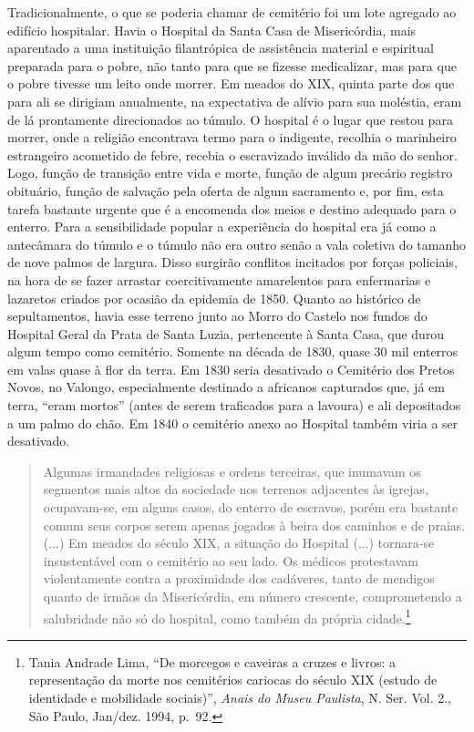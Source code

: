 Tradicionalmente, o que se poderia chamar de cemitério foi um lote
agregado ao edifício hospitalar. Havia o Hospital da Santa Casa de
Misericórdia, mais aparentado a uma instituição filantrópica de
assistência material e espiritual preparada para o pobre, não tanto para
que se fizesse medicalizar, mas para que o pobre tivesse um leito onde
morrer. Em meados do XIX, quinta parte dos que para ali se dirigiam
anualmente, na expectativa de alívio para sua moléstia, eram de lá
prontamente direcionados ao túmulo. O hospital é o lugar que restou para
morrer, onde a religião encontrava termo para o indigente, recolhia o
marinheiro estrangeiro acometido de febre, recebia o escravizado
inválido da mão do senhor. Logo, função de transição entre vida e morte,
função de algum precário registro obituário, função de salvação pela
oferta de algum sacramento e, por fim, esta tarefa bastante urgente que
é a encomenda dos meios e destino adequado para o enterro. Para a
sensibilidade popular a experiência do hospital era já como a antecâmara
do túmulo e o túmulo não era outro senão a vala coletiva do tamanho de
nove palmos de largura. Disso surgirão conflitos incitados por forças
policiais, na hora de se fazer arrastar coercitivamente amarelentos para
enfermarias e lazaretos criados por ocasião da epidemia de 1850. Quanto
ao histórico de sepultamentos, havia esse terreno junto ao Morro do
Castelo nos fundos do Hospital Geral da Prata de Santa Luzia,
pertencente à Santa Casa, que durou algum tempo como cemitério. Somente
na década de 1830, quase 30 mil enterros em valas quase à flor da terra.
Em 1830 seria desativado o Cemitério dos Pretos Novos, no Valongo,
especialmente destinado a africanos capturados que, já em terra, ``eram
mortos'' (antes de serem traficados para a lavoura) e ali depositados a
um palmo do chão. Em 1840 o cemitério anexo ao Hospital também viria a
ser desativado.

\begin{quote}
Algumas irmandades religiosas e ordens terceiras, que inumavam os
segmentos mais altos da sociedade nos terrenos adjacentes às igrejas,
ocupavam-se, em alguns casos, do enterro de escravos, porém era bastante
comum seus corpos serem apenas jogados à beira dos caminhos e de praias.
(...) Em meados do século XIX, a situação do Hospital (...) tornara-se
insustentável com o cemitério ao seu lado. Os médicos protestavam
violentamente contra a proximidade dos cadáveres, tanto de mendigos
quanto de irmãos da Misericórdia, em número crescente, comprometendo a
salubridade não só do hospital, como também da própria cidade.\footnote{Tania
  Andrade Lima, ``De morcegos e caveiras a cruzes e livros: a
  representação da morte nos cemitérios cariocas do século XIX (estudo
  de identidade e mobilidade sociais)'', \emph{Anais do Museu Paulista},
  N. Ser. Vol. 2., São Paulo, Jan/dez. 1994, p.~92.}
\end{quote}

